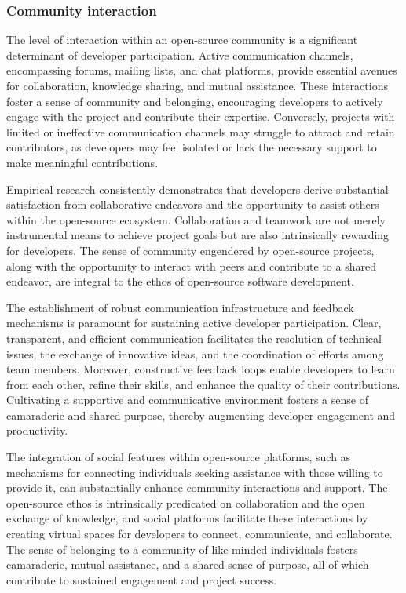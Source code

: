 \subsubsection{Community interaction}
The level of interaction within an open-source community is a significant determinant of developer participation. Active communication channels, encompassing forums, mailing lists, and chat platforms, provide essential avenues for collaboration, knowledge sharing, and mutual assistance. These interactions foster a sense of community and belonging, encouraging developers to actively engage with the project and contribute their expertise. Conversely, projects with limited or ineffective communication channels may struggle to attract and retain contributors, as developers may feel isolated or lack the necessary support to make meaningful contributions.


Empirical research consistently demonstrates that developers derive substantial satisfaction from collaborative endeavors and the opportunity to assist others within the open-source ecosystem. Collaboration and teamwork are not merely instrumental means to achieve project goals but are also intrinsically rewarding for developers. The sense of community engendered by open-source projects, along with the opportunity to interact with peers and contribute to a shared endeavor, are integral to the ethos of open-source software development.

The establishment of robust communication infrastructure and feedback mechanisms is paramount for sustaining active developer participation. Clear, transparent, and efficient communication facilitates the resolution of technical issues, the exchange of innovative ideas, and the coordination of efforts among team members. Moreover, constructive feedback loops enable developers to learn from each other, refine their skills, and enhance the quality of their contributions. Cultivating a supportive and communicative environment fosters a sense of camaraderie and shared purpose, thereby augmenting developer engagement and productivity.

The integration of social features within open-source platforms, such as mechanisms for connecting individuals seeking assistance with those willing to provide it, can substantially enhance community interactions and support. The open-source ethos is intrinsically predicated on collaboration and the open exchange of knowledge, and social platforms facilitate these interactions by creating virtual spaces for developers to connect, communicate, and collaborate. The sense of belonging to a community of like-minded individuals fosters camaraderie, mutual assistance, and a shared sense of purpose, all of which contribute to sustained engagement and project success.

